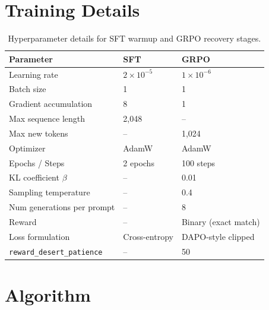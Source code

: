 \section{Training Details}
\label{sec:appendix_training}

\begin{table}[h]
\centering
\small
\caption{Hyperparameter details for SFT warmup and GRPO recovery stages.}
\label{tab:hyperparams}
\begin{tabular}{@{}lll@{}}
\toprule
Parameter & SFT & GRPO \\
\midrule
Learning rate & $2 \times 10^{-5}$ & $1 \times 10^{-6}$ \\
Batch size & 1 & 1 \\
Gradient accumulation & 8 & 1 \\
Max sequence length & 2{,}048 & -- \\
Max new tokens & -- & 1{,}024 \\
Optimizer & AdamW & AdamW \\
Epochs / Steps & 2 epochs & 100 steps \\
KL coefficient $\beta$ & -- & 0.01 \\
Sampling temperature & -- & 0.4 \\
Num generations per prompt & -- & 8 \\
Reward & -- & Binary (exact match) \\
Loss formulation & Cross-entropy & DAPO-style clipped \\
\texttt{reward\_desert\_patience} & -- & 50 \\
\bottomrule
\end{tabular}
\end{table}

\section{Algorithm}
\label{sec:appendix_algo}

